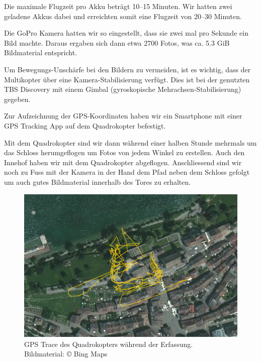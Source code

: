 Die maximale Flugzeit pro Akku beträgt 10--15 Minuten. Wir hatten zwei geladene
Akkus dabei und erreichten somit eine Flugzeit von 20--30 Minuten.

Die GoPro Kamera hatten wir so eingestellt, dass sie zwei mal pro Sekunde ein
Bild machte. Daraus ergaben sich dann etwa 2700 Fotos, was ca. 5.3 GiB
Bildmaterial entspricht.

Um Bewegungs-Unschärfe bei den Bildern zu vermeiden, ist es wichtig, dass der
Multikopter über eine Kamera-Stabilisierung verfügt. Dies ist bei der genutzten
TBS Discovery mit einem Gimbal (gyroskopische Mehrachsen-Stabilisierung)
gegeben.

Zur Aufzeichnung der GPS-Koordinaten haben wir ein Smartphone mit einer GPS
Tracking App auf dem Quadrokopter befestigt.

Mit dem Quadrokopter sind wir dann während einer halben Stunde mehrmals um das
Schloss herumgeflogen um Fotos von jedem Winkel zu erstellen. Auch den Innehof
haben wir mit dem Quadrokopter abgeflogen. Anschliessend sind wir noch zu Fuss
mit der Kamera in der Hand dem Pfad neben dem Schloss gefolgt um auch gutes
Bildmaterial innerhalb des Tores zu erhalten.

\vspace{1\baselineskip}

\begin{figure}[H]
	\centering
	\includegraphics[width=\textwidth]{images/gpstrace_satellite.png}
	\caption{GPS Trace des Quadrokopters während der Erfassung.\\Bildmaterial:
		\copyright{} Bing Maps}
	\label{img:gpstrace-satellite}
\end{figure}

